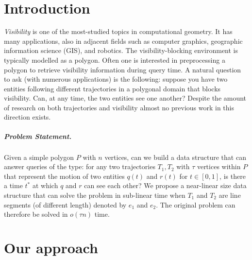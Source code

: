 \documentclass[a4paper, UKenglish]{lipics-v2018}
\newcommand{\etal}{\textit{et al.}\xspace}
\begin{document}
\section{Introduction}
\emph{Visibility} is one of the most-studied topics in computational geometry.
It has many applications, %
also in adjacent fields such as computer graphics,
geographic information science (GIS),
and robotics.
The visibility-blocking environment is typically modelled as a polygon. Often one is interested in preprocessing a polygon to retrieve visibility information during query time. 
A natural question to ask (with numerous applications) is the following: suppose you have two entities following different trajectories in a polygonal domain that blocks visibility. Can, at any time, the two entities see one another? 
Despite the amount of research on both trajectories and visibility almost no previous work in this direction exists.

\subparagraph*{Problem Statement.} 

Given a simple polygon $P$ with $n$ vertices, can we build a data structure that can answer queries of the type: for any two trajectories $T_1, T_2$ with $\tau$ vertices within $P$ that represent the motion of two entities $q(t)$ and $r(t)$ for $t \in [0,1]$, is there a time $t^*$ at which $q$ and $r$ can see each other? 
We propose a near-linear size data structure that can solve the problem in sub-linear time when $T_1$ and $T_2$ are line segments (of different length) denoted by $e_1$ and $e_2$. The original problem can therefore be solved in $o(\tau n)$ time. 

\section{Our approach}
\end{document}
